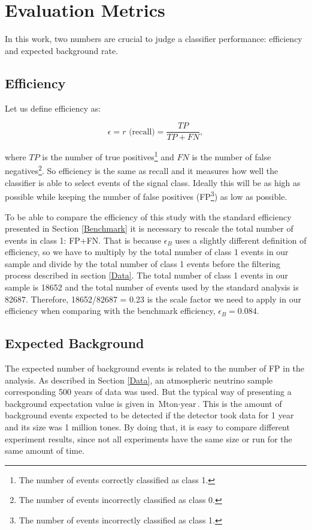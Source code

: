 \section{Evaluation Metrics} \label{Metric}

In this work, two numbers are crucial to judge a classifier performance: efficiency and expected background rate.

\subsection{Efficiency} \label{Efficiency}
Let us define efficiency as:

\begin{equation} \label{eq:eff}
\epsilon = r\textrm{ (recall)} = \frac{TP}{TP + FN},
\end{equation}

where $TP$ is the number of true positives\footnote{The number of events correctly classified as class 1.} and $FN$ is the number of false negatives\footnote{The number of events incorrectly classified as class 0.}. So efficiency is the same as recall and it measures how well the classifier is able to select events of the signal class. Ideally this will be as high as possible while keeping the number of false positives (FP\footnote{The number of events incorrectly classified as class 1.}) as low as possible.

To be able to compare the efficiency of this study with the standard efficiency presented in Section \ref{Benchmark} it is necessary to rescale the total number of events in class 1: FP+FN. That is because $\epsilon_{B}$ uses a slightly different definition of efficiency, so we have to multiply by the total number of class 1 events in our sample and divide by the total number of class 1 events before the filtering process described in section \ref{Data}. The total number of class 1 events in our sample is 18652 and the total number of events used by the standard analysis is 82687. Therefore, 18652/82687 = 0.23 is the scale factor we need to apply in our efficiency when comparing with the benchmark efficiency, $\epsilon_{B} = 0.084$.

\subsection{Expected Background} \label{Background}

The expected number of background events is related to the number of FP in the analysis. As described in Section \ref{Data}, an atmospheric neutrino sample corresponding 500 years of data was used. But the typical way of presenting a background expectation value is given in $\textrm{Mton}\cdot\textrm{year}$. This is the amount of background events expected to be detected if the detector took data for 1 year and its size was 1 million tones. By doing that, it is easy to compare different experiment results, since not all experiments have the same size or run for the same amount of time.

